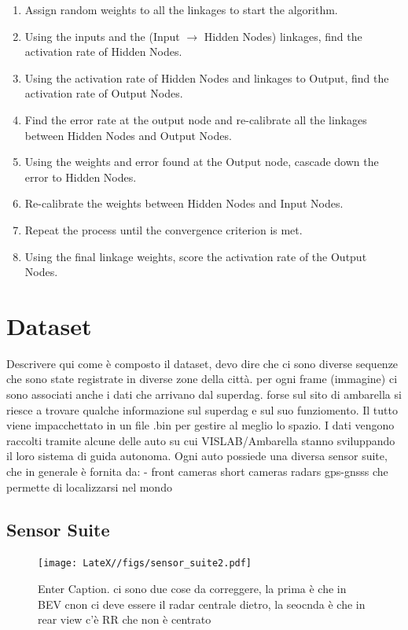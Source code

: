 \begin{enumerate}
    \item Assign random weights to all the linkages to start the algorithm.
    \item Using the inputs and the (Input $\rightarrow$ Hidden Nodes) linkages, find the activation rate of Hidden Nodes.
    \item Using the activation rate of Hidden Nodes and linkages to Output, find the activation rate of Output Nodes.
    \item Find the error rate at the output node and re-calibrate all the linkages between Hidden Nodes and Output Nodes.
    \item Using the weights and error found at the Output node, cascade down the error to Hidden Nodes.
    \item Re-calibrate the weights between Hidden Nodes and Input Nodes.
    \item Repeat the process until the convergence criterion is met.
    \item Using the final linkage weights, score the activation rate of the Output Nodes.
\end{enumerate}




\section{Dataset}
Descrivere qui come è composto il dataset, devo dire che ci sono diverse sequenze che sono state registrate in diverse zone della città. per ogni frame (immagine) ci sono associati anche i dati che arrivano dal superdag. forse sul sito di ambarella si riesce a trovare qualche informazione sul superdag e sul suo funziomento. 
Il tutto viene impacchettato in un file .bin per gestire al meglio lo spazio. 
I dati vengono raccolti tramite alcune delle auto su cui VISLAB/Ambarella stanno sviluppando il loro sistema di guida autonoma. 
Ogni auto possiede una diversa sensor suite, che in generale è fornita da:
- front cameras
short cameras 
radars 
gps-gnsss che permette di localizzarsi nel mondo

\subsection{Sensor Suite}

\begin{figure}
    \centering
    \texttt{[image: LateX//figs/sensor\_suite2.pdf]}
    \caption{Enter Caption. ci sono due cose da correggere, la prima è che in BEV cnon ci deve essere il radar centrale dietro, la seocnda è che in rear view c'è RR che non è centrato}
    \label{fig:enter-label}
\end{figure}



